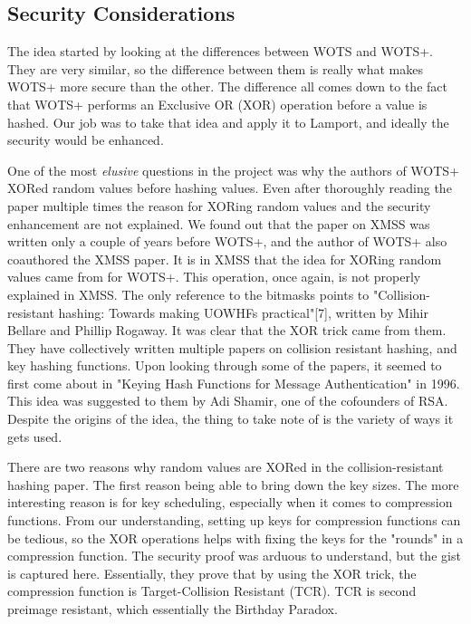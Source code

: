 \documentclass[]{scrartcl}
\begin{document}
\subsection*{Security Considerations}
The idea started by looking at the differences between WOTS and WOTS+. They are very similar, so the difference between them is really what makes WOTS+ more secure than the other. The difference all comes down to the fact that WOTS+ performs an Exclusive OR (XOR) operation before a value is hashed. Our job was to take that idea and apply it to Lamport, and ideally the security would be enhanced.

One of the most \textit{elusive} questions in the project was why the authors of WOTS+ XORed random values before hashing values. Even after thoroughly reading the paper multiple times the reason for XORing random values and the security enhancement are not explained. We found out that the paper on XMSS was written only a couple of years before WOTS+, and the author of WOTS+ also coauthored the XMSS paper. It is in XMSS that the idea for XORing random values came from for WOTS+. This operation, once again, is not properly explained in XMSS. The only reference to the bitmasks points to "Collision-resistant hashing: Towards making UOWHFs practical"[7], written by Mihir Bellare and Phillip Rogaway. It was clear that the XOR trick came from them. They have collectively written multiple papers on collision resistant hashing, and key hashing functions. Upon looking through some of the papers, it seemed to first come about in "Keying Hash Functions for Message Authentication" in 1996. This idea was suggested to them by Adi Shamir, one of the cofounders of RSA. Despite the origins of the idea, the thing to take note of is the variety of ways it gets used.

There are two reasons why random values are XORed in the collision-resistant hashing paper. The first reason being able to bring down the key sizes. The more interesting reason is for key scheduling, especially when it comes to compression functions. From our understanding, setting up keys for compression functions can be tedious, so the XOR operations helps with fixing the keys for the "rounds" in a compression function. The security proof was arduous to understand, but the gist is captured here. Essentially, they prove that by using the XOR trick, the compression function is Target-Collision Resistant (TCR). TCR is second preimage resistant, which essentially the Birthday Paradox. 
\end{document}
